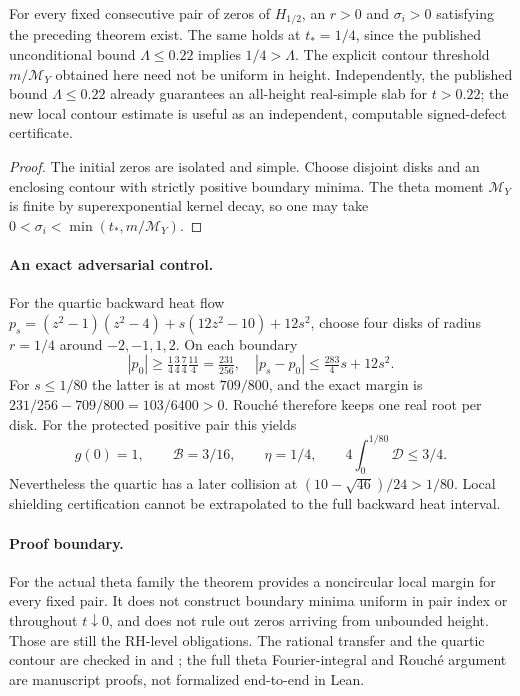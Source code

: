 \begin{corollary}
\label{cor:local-rouche-shield}
For every fixed consecutive pair of zeros of
$H_{1/2}$, an $r>0$ and $\sigma_i>0$
satisfying the preceding theorem exist.
The same holds at $t_*=1/4$, since the
published unconditional bound $\Lambda\le0.22$
implies $1/4>\Lambda$.
The explicit contour threshold $m/\mathcal M_Y$ obtained here need not be uniform in height. Independently, the published bound $\Lambda\le0.22$ already guarantees an all-height real-simple slab for $t>0.22$; the new local contour estimate is useful as an independent, computable signed-defect certificate.
\end{corollary}
\begin{proof}
The initial zeros are isolated and simple.
Choose disjoint disks and an enclosing contour
with strictly positive boundary minima.
The theta moment $\mathcal M_Y$ is finite by
superexponential kernel decay, so one may take
$0<\sigma_i<\min(t_*,m/\mathcal M_Y)$.
\end{proof}

\paragraph{An exact adversarial control.}
For the quartic backward heat flow
$p_s=(z^2-1)(z^2-4)+s(12z^2-10)+12s^2$,
choose four disks of radius $r=1/4$ around
$-2,-1,1,2$. On each boundary
\[
|p_0|\ge\tfrac14\tfrac34\tfrac74\tfrac{11}4
=\tfrac{231}{256},
\quad |p_s-p_0|\le\tfrac{283}{4}s+12s^2.
\]
For $s\le1/80$ the latter is at most
$709/800$, and the exact margin is
$231/256-709/800=103/6400>0$.
Rouch\'e therefore keeps one real root per disk.
For the protected positive pair this yields
\[
g(0)=1,\qquad\mathcal B=3/16,\qquad
\eta=1/4,\qquad
4\int_0^{1/80}\mathcal D\le3/4.
\]
Nevertheless the quartic has a later collision at
$(10-\sqrt{46})/24>1/80$. Local shielding
certification cannot be extrapolated to the
full backward heat interval.

\paragraph{Proof boundary.}
For the actual theta family the theorem provides a
noncircular local margin for every fixed pair.
It does not construct boundary minima uniform in
pair index or throughout $t\downarrow0$, and does
not rule out zeros arriving from unbounded height.
Those are still the RH-level obligations.
The rational transfer and the quartic contour
are checked in 
and ;
the full theta Fourier-integral and Rouch\'e argument
are manuscript proofs, not formalized end-to-end in Lean.
